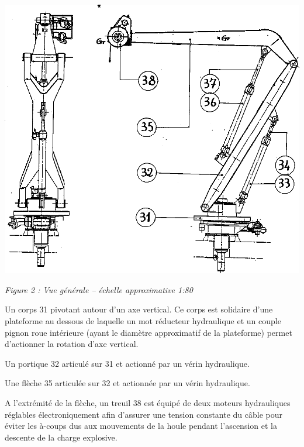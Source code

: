 \documentclass[10pt]{article}
\begin{document}
\begin{minipage}[c]{.6\linewidth}
\begin{center}
\includegraphics[width=.95\textwidth]{images/Grue_02}

\textit{Figure 2 : Vue générale -- échelle approximative 1:80}
\end{center}
\end{minipage} \hfill
\begin{minipage}[c]{.38\linewidth}

Un corps 31 pivotant autour d'un axe vertical. Ce corps est solidaire d'une plateforme au dessous de laquelle un mot réducteur hydraulique et un couple pignon roue intérieure (ayant le diamètre approximatif de la plateforme) permet d'actionner la rotation d'axe vertical.


Un portique 32 articulé sur 31 et actionné par un vérin hydraulique. 

Une flèche 35 articulée sur 32 et actionnée par un vérin hydraulique. 
\end{minipage}

\vspace{.25cm}

A l'extrémité de la flèche, un treuil 38 est équipé de deux moteurs hydrauliques réglables électroniquement afin d'assurer une tension constante du câble pour éviter les à-coups dus aux mouvements de la houle pendant l'ascension et la descente de la charge explosive. 
\end{document}
